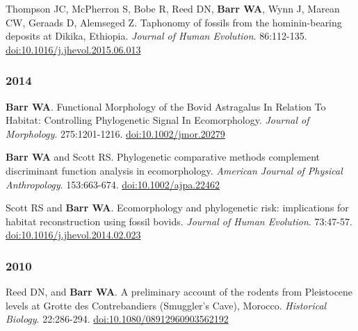 \item  Thompson JC, McPherron S, Bobe R, Reed DN, {\bfseries Barr WA}, Wynn J, Marean CW, Geraads D, Alemseged Z. Taphonomy of fossils from the hominin-bearing deposits at Dikika, Ethiopia. \emph{Journal of Human Evolution}. 86:112-135. \href{http://dx.doi.org/10.1016/j.jhevol.2015.06.013}{doi:10.1016/j.jhevol.2015.06.013}

\subsubsection*{2014}

\item  {\bfseries Barr WA}. Functional Morphology of the Bovid Astragalus In Relation To Habitat: Controlling Phylogenetic Signal In Ecomorphology. \emph{Journal of Morphology}. 275:1201-1216. \href{http://dx.doi.org/10.1002/jmor.20279}{doi:10.1002/jmor.20279}

\item  {\bfseries Barr WA} and Scott RS. Phylogenetic comparative methods complement discriminant function analysis in ecomorphology. \emph{American Journal of Physical Anthropology}. 153:663-674. \href{http://dx.doi.org/10.1002/ajpa.22462}{doi:10.1002/ajpa.22462}

\item  Scott RS and {\bfseries Barr WA}. Ecomorphology and phylogenetic risk: implications for habitat reconstruction using fossil bovids. \emph{Journal of Human Evolution}. 73:47-57. \href{http://dx.doi.org/10.1016/j.jhevol.2014.02.023}{doi:10.1016/j.jhevol.2014.02.023}

\subsubsection*{2010}

\item  Reed DN, and {\bfseries Barr WA}. A preliminary account of the rodents from Pleistocene levels at Grotte des Contrebandiers (Smuggler's Cave), Morocco. \emph{Historical Biology}. 22:286-294. \href{http://dx.doi.org/10.1080/08912960903562192}{doi:10.1080/08912960903562192}




